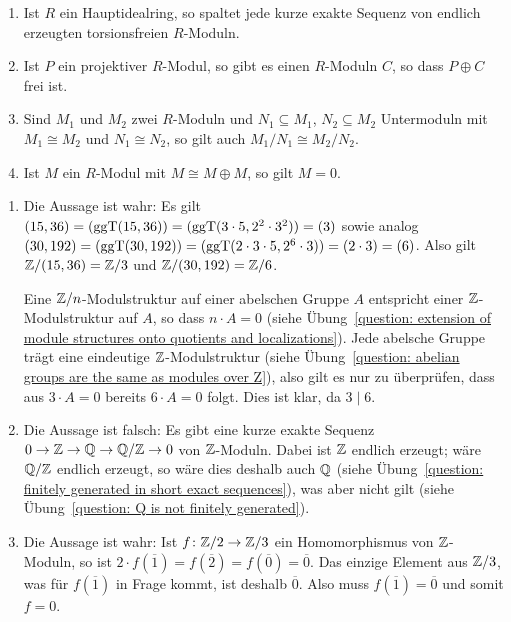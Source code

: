 \begin{question}[subtitle = Wahr oder Falsch?]
\begin{enumerate}
    \item
      Ist $R$ ein Hauptidealring, so spaltet jede kurze exakte Sequenz von endlich erzeugten torsionsfreien $R$-Moduln.
    \item
      Ist $P$ ein projektiver $R$-Modul, so gibt es einen $R$-Moduln $C$, so dass $P \oplus C$ frei ist.
    \item
      Sind $M_1$ und $M_2$ zwei $R$-Moduln und $N_1 \subseteq M_1$, $N_2 \subseteq M_2$ Untermoduln mit $M_1 \cong M_2$ und $N_1 \cong N_2$, so gilt auch $M_1/N_1 \cong M_2/N_2$.
    \item
      Ist $M$ ein $R$-Modul mit $M \cong M \oplus M$, so gilt $M = 0$.
  \end{enumerate}
\end{question}


\begin{solution}
  \begin{enumerate}
    \item
      Die Aussage ist wahr:
      Es gilt $(15,36) = (\operatorname{ggT}(15,36)) = (\operatorname{ggT}(3 \cdot 5, 2^2 \cdot 3^2)) = (3)$ sowie analog $(30,192)  = (\operatorname{ggT}(30,192)) = (\operatorname{ggT}(2 \cdot 3 \cdot 5, 2^6 \cdot 3)) = (2 \cdot 3) = (6)$.
      Also gilt $\mathbb{Z}/(15,36) = \mathbb{Z}/3$ und $\mathbb{Z}/(30,192) = \mathbb{Z}/6$.
      
      Eine $\mathbb{Z}/n$-Modulstruktur auf einer abelschen Gruppe $A$ entspricht einer $\mathbb{Z}$-Modulstruktur auf $A$, so dass $n \cdot A = 0$ (siehe Übung~\ref{question: extension of module structures onto quotients and localizations}).
      Jede abelsche Gruppe trägt eine eindeutige $\mathbb{Z}$-Modulstruktur (siehe Übung~\ref{question: abelian groups are the same as modules over Z}), also gilt es nur zu überprüfen, dass aus $3 \cdot A = 0$ bereits $6 \cdot A = 0$ folgt.
      Dies ist klar, da $3 \mid 6$.

    \item
      Die Aussage ist falsch:
      Es gibt eine kurze exakte Sequenz $0 \to \mathbb{Z} \to \mathbb{Q} \to \mathbb{Q}/\mathbb{Z} \to 0$ von $\mathbb{Z}$-Moduln.
      Dabei ist $\mathbb{Z}$ endlich erzeugt;
      wäre $\mathbb{Q}/\mathbb{Z}$ endlich erzeugt, so wäre dies deshalb auch $\mathbb{Q}$ (siehe Übung~\ref{question: finitely generated in short exact sequences}), was aber nicht gilt (siehe Übung~\ref{question: Q is not finitely generated}).
    
    \item
      Die Aussage ist wahr:
      Ist $f \colon \mathbb{Z}/2 \to \mathbb{Z}/3$ ein Homomorphismus von $\mathbb{Z}$-Moduln, so ist $2 \cdot f(\overline{1}) = f(\overline{2}) = f(\overline{0}) = \overline{0}$.
      Das einzige Element aus $\mathbb{Z}/3$, was für $f(\overline{1})$ in Frage kommt, ist deshalb $\overline{0}$.
      Also muss $f(\overline{1}) = \overline{0}$ und somit $f = 0$.
    

\end{enumerate}
\end{solution}
